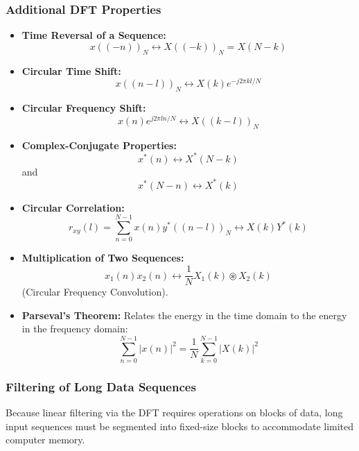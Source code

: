 \hypertarget{additional-dft-properties}{%
\subsubsection{Additional DFT
Properties}\label{additional-dft-properties}}

\begin{itemize}
\tightlist
\item
  \textbf{Time Reversal of a Sequence:}
  \[x(( -n ))_N \leftrightarrow X(( -k ))_N = X(N-k)\]
\item
  \textbf{Circular Time Shift:}
  \[x(( n-l ))_N \leftrightarrow X(k) e^{-j 2\pi kl/N}\]
\item
  \textbf{Circular Frequency Shift:}
  \[x(n) e^{j 2\pi ln/N} \leftrightarrow X(( k-l ))_N\]
\item
  \textbf{Complex-Conjugate Properties:}
  \[x^*(n) \leftrightarrow X^*(N-k)\] and
  \[x^*(N-n) \leftrightarrow X^*(k)\]
\item
  \textbf{Circular Correlation:}
  \[r_{xy}(l) = \sum_{n=0}^{N-1} x(n) y^*((n-l))_N \leftrightarrow X(k) Y^*(k)\]
\item
  \textbf{Multiplication of Two Sequences:}
  \[x_1(n)x_2(n) \leftrightarrow \frac{1}{N} X_1(k) \circledast X_2(k)\]
  (Circular Frequency Convolution).
\item
  \textbf{Parseval's Theorem:} Relates the energy in the time domain to
  the energy in the frequency domain:
  \[\sum_{n=0}^{N-1} |x(n)|^2 = \frac{1}{N} \sum_{k=0}^{N-1} |X(k)|^2\]
\end{itemize}

\hypertarget{filtering-of-long-data-sequences}{%
\subsubsection{Filtering of Long Data
Sequences}\label{filtering-of-long-data-sequences}}

Because linear filtering via the DFT requires operations on blocks of
data, long input sequences must be segmented into fixed-size blocks to
accommodate limited computer memory.

